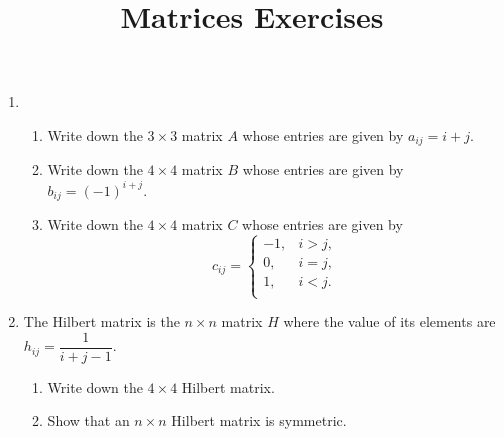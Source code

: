 \documentclass[a4paper,11pt]{article}
\title{Matrices Exercises}
\begin{document}
\maketitle

\begin{enumerate}[label=1.\arabic*]
    \item
    \begin{enumerate}
        \item Write down the $3 \times 3$ matrix $A$ whose entries are given by $a_{ij} = i+j.$
        \item Write down the $4 \times 4$ matrix $B$ whose entries are given by $b_{ij} = (-1)^{i+j}.$
        \item Write down the $4 \times 4$ matrix $C$ whose entries are given by 
        $$c_{ij} = 
            \begin{cases}
            -1, & i>j, \\
            0, & i=j, \\
            1, & i<j. \\
            \end{cases} $$
    \end{enumerate}

    \item The Hilbert matrix is the $n \times n$ matrix $H$ where the value of its elements are $h_{ij} = \dfrac{1}{i + j - 1}$. 
    \begin{enumerate}
        \item Write down the $4 \times 4$ Hilbert matrix. 
        \item Show that an $n \times n$ Hilbert matrix is symmetric. 
    \end{enumerate}


\end{enumerate}
\end{document}
